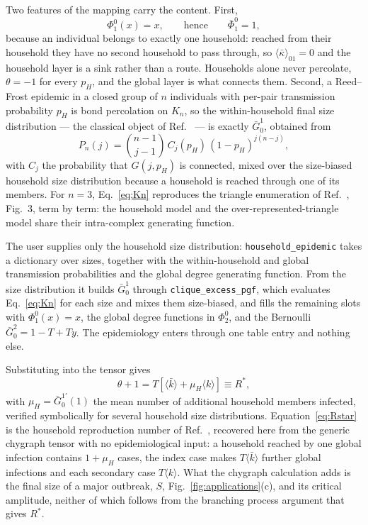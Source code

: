 \documentclass[aps,pre,twocolumn,superscriptaddress,floatfix,longbibliography]{revtex4-2}
\newcommand{\ave}[1]{\langle #1 \rangle}
\newcommand{\kb}{\bar{k}}
\newcommand{\code}[1]{\texttt{#1}}
\begin{document}
Two features of the mapping carry the content. First,
\begin{equation}
  \Phi^0_1(x)=x,\qquad\text{hence}\qquad \bar\Phi^0_1=1,
\end{equation}
because an individual belongs to exactly one household: reached from their
household they have no second household to pass through, so
$\ave{\bar\kappa}_{01}=0$ and the household layer is a sink rather than a route.
Households alone never percolate, $\theta=-1$ for every $p_H$, and the global
layer is what connects them. Second, a Reed--Frost epidemic in a closed group of
$n$ individuals with per-pair transmission probability $p_H$ is bond percolation
on $K_n$, so the within-household final size distribution --- the classical
object of Ref.~\cite{ball1986} --- is exactly $\bar G^1_0$, obtained from
\begin{equation}
  P_n(j)=\binom{n-1}{j-1}\,C_j(p_H)\,(1-p_H)^{j(n-j)},
  \label{eq:Kn}
\end{equation}
with $C_j$ the probability that $G(j,p_H)$ is connected, mixed over the
size-biased household size distribution because a household is reached through
one of its members. For $n=3$, Eq.~\eqref{eq:Kn} reproduces the triangle
enumeration of Ref.~\cite{vazquez2024comnet}, Fig.~3, term by term: the
household model and the over-represented-triangle model share their
intra-complex generating function.

The user supplies only the household size distribution: \code{household\_epidemic}
takes a dictionary over sizes, together with the within-household and global
transmission probabilities and the global degree generating function. From the
size distribution it builds $\bar G^1_0$ through
\code{clique\_excess\_pgf}, which evaluates Eq.~\eqref{eq:Kn} for each size and
mixes them size-biased, and fills the remaining slots with $\Phi^0_1(x)=x$, the
global degree functions in $\Phi^0_2$, and the Bernoulli $\bar G^2_0=1-T+Ty$. The
epidemiology enters through one table entry and nothing else.

Substituting into the tensor gives
\begin{equation}
  \theta+1=T\left[\ave{\kb}+\mu_H\ave{k}\right]\equiv R^*,
  \label{eq:Rstar}
\end{equation}
with $\mu_H=\bar G^{1\prime}_0(1)$ the mean number of additional household
members infected, verified symbolically for several household size
distributions. Equation~\eqref{eq:Rstar} is the household reproduction number of
Ref.~\cite{ball1997}, recovered here from the generic chygraph tensor with no
epidemiological input: a household reached by one global infection contains
$1+\mu_H$ cases, the index case makes $T\ave{\kb}$ further global infections and
each secondary case $T\ave{k}$. What the chygraph calculation adds is the final
size of a major outbreak, $S$, Fig.~\ref{fig:applications}(c), and its critical
amplitude, neither of which follows from the branching process argument that
gives $R^*$.
\end{document}
